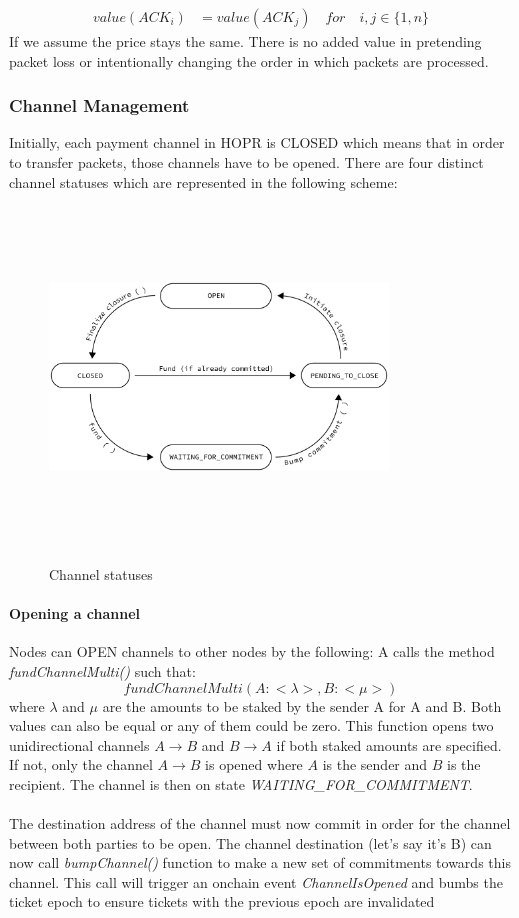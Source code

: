 \begin{align}
 value ( ACK_i )  &  =value ( ACK_j ) \quad for \quad i,j\in \{1,n\}
\end{align}
If we assume the price stays the same. There is no added value in pretending packet loss or intentionally changing the order in which packets are processed.

\subsubsection{Channel Management}
Initially, each payment channel in HOPR is CLOSED which means that in order to transfer packets, those channels have to be opened. There are four distinct channel statuses which are represented in the following scheme:

\begin{figure}[H]
    \centering
    \includegraphics[width=9cm,height=9cm,keepaspectratio]{../yellowpaper/images/states1.png}
\label{fig:channel statuses}
    \caption{Channel statuses}
\end{figure}

\paragraph{Opening a channel} Nodes can OPEN channels to other nodes by the following:
A calls the method \textit{fundChannelMulti()} such that:
$$fundChannelMulti(A: <\lambda>, B:<\mu> )$$ where $\lambda$ and $\mu$ are the amounts to be staked by the sender A for A and B. Both values can also be equal or any of them could be zero. This function opens two unidirectional channels $A\rightarrow B$ and $B\rightarrow A$ if both staked amounts are specified. If not, only the channel $A\rightarrow B$ is opened where $A$ is the sender and $B$ is the recipient.
The channel is then on state \textit{WAITING\_FOR\_COMMITMENT}.
\\~\\The destination address of the channel must now commit in order for the channel between both parties to be open.
The channel destination (let's say it's B) can now call \textit{bumpChannel()} function to make a new set of commitments towards this channel. This call will trigger an onchain event \textit{ChannelIsOpened} and bumbs the ticket epoch to ensure tickets with the previous epoch are invalidated

